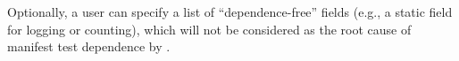 Optionally, a user can specify a
list of ``dependence-free''
fields (e.g., a static field for
logging or counting), which will not be considered
as the root cause of manifest test
dependence by \ourtool.
















